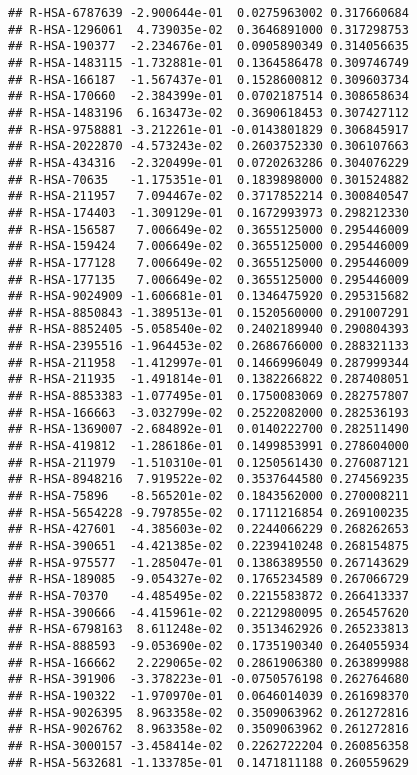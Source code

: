 \documentclass[
]{article}
\begin{document}
\begin{verbatim}
## R-HSA-6787639 -2.900644e-01  0.0275963002 0.317660684
## R-HSA-1296061  4.739035e-02  0.3646891000 0.317298753
## R-HSA-190377  -2.234676e-01  0.0905890349 0.314056635
## R-HSA-1483115 -1.732881e-01  0.1364586478 0.309746749
## R-HSA-166187  -1.567437e-01  0.1528600812 0.309603734
## R-HSA-170660  -2.384399e-01  0.0702187514 0.308658634
## R-HSA-1483196  6.163473e-02  0.3690618453 0.307427112
## R-HSA-9758881 -3.212261e-01 -0.0143801829 0.306845917
## R-HSA-2022870 -4.573243e-02  0.2603752330 0.306107663
## R-HSA-434316  -2.320499e-01  0.0720263286 0.304076229
## R-HSA-70635   -1.175351e-01  0.1839898000 0.301524882
## R-HSA-211957   7.094467e-02  0.3717852214 0.300840547
## R-HSA-174403  -1.309129e-01  0.1672993973 0.298212330
## R-HSA-156587   7.006649e-02  0.3655125000 0.295446009
## R-HSA-159424   7.006649e-02  0.3655125000 0.295446009
## R-HSA-177128   7.006649e-02  0.3655125000 0.295446009
## R-HSA-177135   7.006649e-02  0.3655125000 0.295446009
## R-HSA-9024909 -1.606681e-01  0.1346475920 0.295315682
## R-HSA-8850843 -1.389513e-01  0.1520560000 0.291007291
## R-HSA-8852405 -5.058540e-02  0.2402189940 0.290804393
## R-HSA-2395516 -1.964453e-02  0.2686766000 0.288321133
## R-HSA-211958  -1.412997e-01  0.1466996049 0.287999344
## R-HSA-211935  -1.491814e-01  0.1382266822 0.287408051
## R-HSA-8853383 -1.077495e-01  0.1750083069 0.282757807
## R-HSA-166663  -3.032799e-02  0.2522082000 0.282536193
## R-HSA-1369007 -2.684892e-01  0.0140222700 0.282511490
## R-HSA-419812  -1.286186e-01  0.1499853991 0.278604000
## R-HSA-211979  -1.510310e-01  0.1250561430 0.276087121
## R-HSA-8948216  7.919522e-02  0.3537644580 0.274569235
## R-HSA-75896   -8.565201e-02  0.1843562000 0.270008211
## R-HSA-5654228 -9.797855e-02  0.1711216854 0.269100235
## R-HSA-427601  -4.385603e-02  0.2244066229 0.268262653
## R-HSA-390651  -4.421385e-02  0.2239410248 0.268154875
## R-HSA-975577  -1.285047e-01  0.1386389550 0.267143629
## R-HSA-189085  -9.054327e-02  0.1765234589 0.267066729
## R-HSA-70370   -4.485495e-02  0.2215583872 0.266413337
## R-HSA-390666  -4.415961e-02  0.2212980095 0.265457620
## R-HSA-6798163  8.611248e-02  0.3513462926 0.265233813
## R-HSA-888593  -9.053690e-02  0.1735190340 0.264055934
## R-HSA-166662   2.229065e-02  0.2861906380 0.263899988
## R-HSA-391906  -3.378223e-01 -0.0750576198 0.262764680
## R-HSA-190322  -1.970970e-01  0.0646014039 0.261698370
## R-HSA-9026395  8.963358e-02  0.3509063962 0.261272816
## R-HSA-9026762  8.963358e-02  0.3509063962 0.261272816
## R-HSA-3000157 -3.458414e-02  0.2262722204 0.260856358
## R-HSA-5632681 -1.133785e-01  0.1471811188 0.260559629

\end{verbatim}
\end{document}
